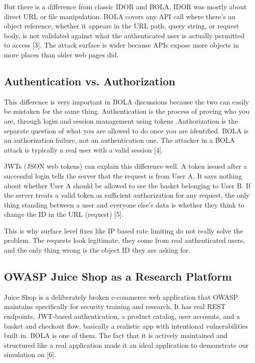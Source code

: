 \documentclass[12pt]{IEEEtran}
\begin{document}
But there is a difference from classic IDOR and BOLA. IDOR was mostly about direct URL or file manipulation. BOLA covers any API call where there's an object reference, whether it appears in the URL path, query string, or request body, is not validated against what the authenticated user is actually permitted to access [3]. The attack surface is wider because APIs expose more objects in more places than older web pages did.

\subsection{Authentication vs. Authorization}

This difference is very important in BOLA discussions because the two can easily be mistaken for the same thing. Authentication is the process of proving who you are, through login and session management using tokens .Authorization is the separate question of what you are allowed to do once you are identified. BOLA is an authorization failure, not an authentication one. The attacker in a BOLA attack is typically a real user with a valid session [4].

JWTs (JSON web tokens) can explain this difference well. A token issued after a successful login tells the server that the request is from User A. It says nothing about whether User A should be allowed to see the basket belonging to User B. If the server treats a valid token as sufficient authorization for any request, the only thing standing between a user and everyone else's data is whether they think to change the ID in the URL (request) [5].

This is why surface level fixes like IP based rate limiting do not really solve the problem. The requests look legitimate, they come from real authenticated users, and the only thing wrong is the object ID they are asking for.

\subsection{OWASP Juice Shop as a Research Platform}

Juice Shop is a deliberately broken e-commerce web application that OWASP maintains specifically for security training and research. It has real REST endpoints, JWT-based authentication, a product catalog, user accounts, and a basket and checkout flow, basically a realistic app with intentional vulnerabilities built in. BOLA is one of them. The fact that it is actively maintained and structured like a real application made it an ideal application to demonstrate our simulation on [6].
\end{document}
